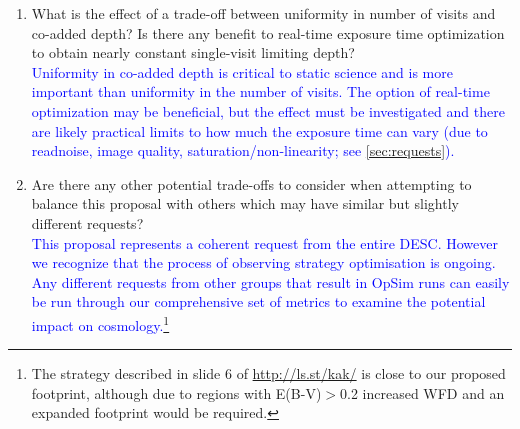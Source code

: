 \documentclass[12pt, letterpaper]{article}
\newcommand{\ml}[1]{{\textcolor{blue}{#1}}}
\begin{document}
\begin{footnotesize}
{\begin{enumerate}
    \item What is the effect of a trade-off between uniformity in number of visits and co-added depth? Is there any benefit to real-time exposure time optimization to obtain nearly constant single-visit limiting depth?\\
    \ml{Uniformity in co-added depth is critical to static science and is more important than uniformity in the number of visits. The option of real-time optimization may be beneficial,  
    but the effect must be investigated and there are likely 
    practical 
    limits to how much the exposure time can vary (due to readnoise, image quality, saturation/non-linearity; see \autoref{sec:requests}).}
    \item Are there any other potential trade-offs to consider when attempting to balance this proposal with others which may have similar but slightly different requests?\\
    \ml{This proposal represents a coherent request from the entire DESC. However we recognize that the process of observing strategy optimisation is ongoing. Any different requests from other groups that result in OpSim runs can easily be run through our comprehensive set of metrics to examine the potential impact on cosmology.\footnote{The strategy described in slide 6 of \url{http://ls.st/kak/} is close to our proposed footprint, although due to regions with E(B-V)$>$0.2 increased WFD and an expanded footprint would be required.}
    }
\end{enumerate}}
\end{footnotesize}

\newpage
\end{document}
